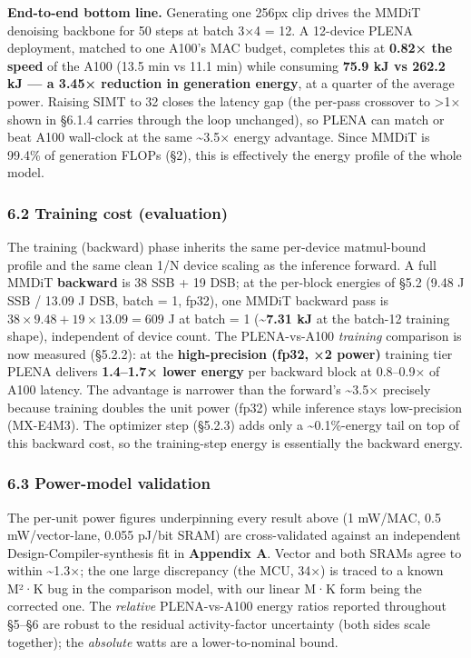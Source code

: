 \documentclass[
  10pt,
]{article}
\begin{document}
\textbf{End-to-end bottom line.} Generating one 256px clip drives the
MMDiT denoising backbone for 50 steps at batch 3×4 = 12. A 12-device
PLENA deployment, matched to one A100's MAC budget, completes this at
\textbf{0.82× the speed} of the A100 (13.5 min vs 11.1 min) while
consuming \textbf{75.9 kJ vs 262.2 kJ --- a 3.45× reduction in
generation energy}, at a quarter of the average power. Raising SIMT to
32 closes the latency gap (the per-pass crossover to \textgreater1×
shown in §6.1.4 carries through the loop unchanged), so PLENA can match
or beat A100 wall-clock at the same \textasciitilde3.5× energy advantage.
Since MMDiT is 99.4\% of generation FLOPs (§2), this is effectively the
energy profile of the whole model.

\subsubsection{6.2 Training cost (evaluation)}\label{training-cost-evaluation}

The training (backward) phase inherits the same per-device matmul-bound
profile and the same clean 1/N device scaling as the inference forward. A
full MMDiT \textbf{backward} is 38 SSB + 19 DSB; at the per-block energies
of §5.2 (9.48 J SSB / 13.09 J DSB, batch = 1, fp32), one MMDiT backward
pass is \(38 \times 9.48 + 19 \times 13.09 = 609\) J at batch = 1
(\textbf{\textasciitilde7.31 kJ} at the batch-12 training shape),
independent of device count. The PLENA-vs-A100 \emph{training} comparison
is now measured (§5.2.2): at the \textbf{high-precision (fp32, ×2 power)}
training tier PLENA delivers \textbf{1.4--1.7× lower energy} per backward
block at 0.8--0.9× of A100 latency. The advantage is narrower than the
forward's \textasciitilde3.5× precisely because training doubles the unit
power (fp32) while inference stays low-precision (MX-E4M3).
The optimizer step (§5.2.3) adds only a \textasciitilde0.1\%-energy tail on
top of this backward cost, so the training-step energy is essentially the
backward energy.

\subsubsection{6.3 Power-model validation}\label{power-model-validation-pointer}

The per-unit power figures underpinning every result above (1 mW/MAC,
0.5 mW/vector-lane, 0.055 pJ/bit SRAM) are cross-validated against an
independent Design-Compiler-synthesis fit in \textbf{Appendix A}. Vector
and both SRAMs agree to within \textasciitilde1.3×; the one large
discrepancy (the MCU, 34×) is traced to a known M²·K bug in the
comparison model, with our linear M·K form being the corrected one. The
\emph{relative} PLENA-vs-A100 energy ratios reported throughout §5--§6
are robust to the residual activity-factor uncertainty (both sides scale
together); the \emph{absolute} watts are a lower-to-nominal bound.
\end{document}
